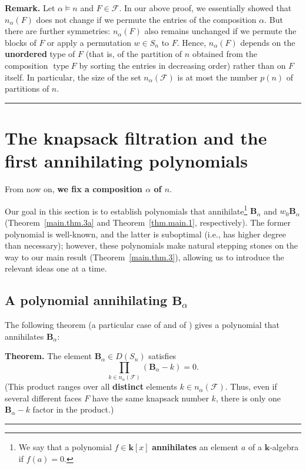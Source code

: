 \documentclass[12pt]{article}
\theoremstyle{definition}%
\newtheorem{thm}{Theorem}[section]
\theoremstyle{definition}%
\theoremstyle{remark}%
\newtheorem*{rem}{Remark}
\newcommand{\tup}[1]{\left( #1 \right)}
\newcommand{\sbr}[1]{\left[ #1 \right]} %
\newcommand{\kk}{\mathbf{k}}
\newcommand{\dsn}{D\left(S_n\right)}
\newcommand{\BBa}{\mathbf{B}_{\alpha}}
\newcommand{\CF}{\mathcal{F}}
\newcommand{\wo}{w_0} %
\newcommand{\na}{n_{ \alpha } }%
\newcommand{\type}{\operatorname{type}}
\newcommand{\defin}[1]{\textbf{#1}}
\newenvironment{thm}[1][Theorem]{\noindent\textbf{#1.} }{\ \rule{0.5em}{0.5em}}
\newenvironment{rem}[1][Remark]{\noindent\textbf{#1.} }{\ \rule{0.5em}{0.5em}}
\begin{document}
\begin{rem}
    Let $\alpha \models n$ and $F \in \CF$.
	In our above proof, we essentially showed that $\na\tup{F}$ does not change if we permute the entries of the composition $\alpha$.
	But there are further symmetries: $\na\tup{F}$ also remains unchanged if we permute the blocks of $F$ or apply a permutation $w \in S_n$ to $F$.
	Hence, $\na\tup{F}$ depends on the \textbf{unordered} type of $F$ (that is, of the partition of $n$ obtained from the composition $\type F$ by sorting the entries in decreasing order) rather than on $F$ itself.
	In particular, the size of the set $\na\tup{\CF}$ is at most the number $p\tup{n}$ of partitions of $n$.
\end{rem}


\section{\label{sec.longpol}The knapsack filtration and the first annihilating polynomials}

From now on, \textbf{we fix a composition $\alpha$ of $n$}.

Our goal in this section is to establish polynomials that annihilate\footnote{We say that a polynomial $f \in \kk\sbr{x}$ \defin{annihilates} an element $a$ of a $\kk$-algebra if $f\tup{a} = 0$.} $\BBa$ and $\wo \BBa$ (Theorem~\ref{main.thm.3a} and Theorem~\ref{thm.main.1}, respectively).
The former polynomial is well-known, and the latter is suboptimal (i.e., has higher degree than necessary);
however, these polynomials make natural stepping stones on the way to our main result (Theorem~\ref{main.thm.3}), allowing us to introduce the relevant ideas one at a time.

\subsection{A polynomial annihilating $\BBa$}

The following theorem (a particular case of \cite[Proposition 3.12]{ncsf2} and of \cite[Theorem 4.1]{Schocker})
gives a polynomial that annihilates $\BBa$:

\begin{thm}
\label{main.thm.3a}
The element $\BBa \in \dsn$ satisfies
\begin{equation}
\prod_{k\in \na\tup{\CF}} \tup{\BBa - k}
=0.
\label{eq.main.3a}
\end{equation}
(This product ranges over all \textbf{distinct}
elements $k \in \na\tup{\CF}$. Thus, even if several different
faces $F$ have the same knapsack number $k$, there
is only one $\BBa - k$ factor in the product.)
\end{thm}
\end{document}

